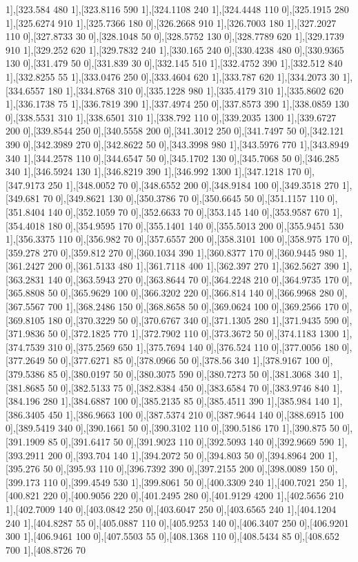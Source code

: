 {1],[323.584 480 1],[323.8116 590 1],[324.1108 240 1],[324.4448 110 0],[325.1915 280 1],[325.6274 910 1],[325.7366 180 0],[326.2668 910 1],[326.7003 180 1],[327.2027 110 0],[327.8733 30 0],[328.1048 50 0],[328.5752 130 0],[328.7789 620 1],[329.1739 910 1],[329.252 620 1],[329.7832 240 1],[330.165 240 0],[330.4238 480 0],[330.9365 130 0],[331.479 50 0],[331.839 30 0],[332.145 510 1],[332.4752 390 1],[332.512 840 1],[332.8255 55 1],[333.0476 250 0],[333.4604 620 1],[333.787 620 1],[334.2073 30 1],[334.6557 180 1],[334.8768 310 0],[335.1228 980 1],[335.4179 310 1],[335.8602 620 1],[336.1738 75 1],[336.7819 390 1],[337.4974 250 0],[337.8573 390 1],[338.0859 130 0],[338.5531 310 1],[338.6501 310 1],[338.792 110 0],[339.2035 1300 1],[339.6727 200 0],[339.8544 250 0],[340.5558 200 0],[341.3012 250 0],[341.7497 50 0],[342.121 390 0],[342.3989 270 0],[342.8622 50 0],[343.3998 980 1],[343.5976 770 1],[343.8949 340 1],[344.2578 110 0],[344.6547 50 0],[345.1702 130 0],[345.7068 50 0],[346.285 340 1],[346.5924 130 1],[346.8219 390 1],[346.992 1300 1],[347.1218 170 0],[347.9173 250 1],[348.0052 70 0],[348.6552 200 0],[348.9184 100 0],[349.3518 270 1],[349.681 70 0],[349.8621 130 0],[350.3786 70 0],[350.6645 50 0],[351.1157 110 0],[351.8404 140 0],[352.1059 70 0],[352.6633 70 0],[353.145 140 0],[353.9587 670 1],[354.4018 180 0],[354.9595 170 0],[355.1401 140 0],[355.5013 200 0],[355.9451 530 1],[356.3375 110 0],[356.982 70 0],[357.6557 200 0],[358.3101 100 0],[358.975 170 0],[359.278 270 0],[359.812 270 0],[360.1034 390 1],[360.8377 170 0],[360.9445 980 1],[361.2427 200 0],[361.5133 480 1],[361.7118 400 1],[362.397 270 1],[362.5627 390 1],[363.2831 140 0],[363.5943 270 0],[363.8644 70 0],[364.2248 210 0],[364.9735 170 0],[365.8808 50 0],[365.9629 100 0],[366.3202 220 0],[366.814 140 0],[366.9968 280 0],[367.5567 700 1],[368.2486 150 0],[368.8658 50 0],[369.0624 100 0],[369.2566 170 0],[369.8105 180 0],[370.3229 50 0],[370.6767 340 0],[371.1305 280 1],[371.9435 590 0],[371.9836 50 0],[372.1825 770 1],[372.7902 110 0],[373.3672 50 0],[374.1183 1300 1],[374.7539 310 0],[375.2569 650 1],[375.7694 140 0],[376.524 110 0],[377.0056 180 0],[377.2649 50 0],[377.6271 85 0],[378.0966 50 0],[378.56 340 1],[378.9167 100 0],[379.5386 85 0],[380.0197 50 0],[380.3075 590 0],[380.7273 50 0],[381.3068 340 1],[381.8685 50 0],[382.5133 75 0],[382.8384 450 0],[383.6584 70 0],[383.9746 840 1],[384.196 280 1],[384.6887 100 0],[385.2135 85 0],[385.4511 390 1],[385.984 140 1],[386.3405 450 1],[386.9663 100 0],[387.5374 210 0],[387.9644 140 0],[388.6915 100 0],[389.5419 340 0],[390.1661 50 0],[390.3102 110 0],[390.5186 170 1],[390.875 50 0],[391.1909 85 0],[391.6417 50 0],[391.9023 110 0],[392.5093 140 0],[392.9669 590 1],[393.2911 200 0],[393.704 140 1],[394.2072 50 0],[394.803 50 0],[394.8964 200 1],[395.276 50 0],[395.93 110 0],[396.7392 390 0],[397.2155 200 0],[398.0089 150 0],[399.173 110 0],[399.4549 530 1],[399.8061 50 0],[400.3309 240 1],[400.7021 250 1],[400.821 220 0],[400.9056 220 0],[401.2495 280 0],[401.9129 4200 1],[402.5656 210 1],[402.7009 140 0],[403.0842 250 0],[403.6047 250 0],[403.6565 240 1],[404.1204 240 1],[404.8287 55 0],[405.0887 110 0],[405.9253 140 0],[406.3407 250 0],[406.9201 300 1],[406.9461 100 0],[407.5503 55 0],[408.1368 110 0],[408.5434 85 0],[408.652 700 1],[408.8726 70 }
